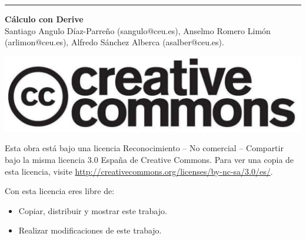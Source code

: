 \thispagestyle{empty}
\null
\vfill
\hrule depth 3pt
\smallskip

\sffamily

\noindent \textbf{Cálculo con Derive}\\
Santiago Angulo Díaz-Parreño (sangulo@ceu.es), Anselmo Romero Limón (arlimon@ceu.es), Alfredo Sánchez Alberca (asalber@ceu.es). 

\bigskip
\begin{center}
\includegraphics[scale=0.1]{img/cc-logo}
\end{center}

\medskip

\small
Esta obra está bajo una licencia Reconocimiento -- No comercial -- Compartir bajo la misma licencia 3.0 España de Creative Commons.
Para ver una copia de esta licencia, visite \url{http://creativecommons.org/licenses/by-nc-sa/3.0/es/}.

\medskip
Con esta licencia eres libre de:
\begin{itemize}
\item Copiar, distribuir y mostrar este trabajo.
\item Realizar modificaciones de este trabajo.
\end{itemize}

